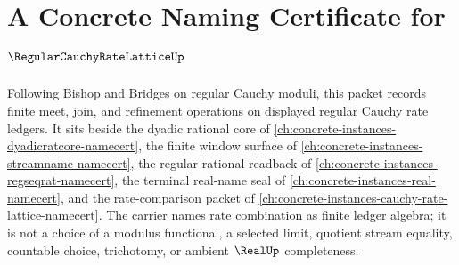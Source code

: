 \chapter{A Concrete Naming Certificate for $\RegularCauchyRateLatticeUp$}
\label{ch:concrete-instances-regular-cauchy-rate-lattice-namecert}

Following Bishop and Bridges on regular Cauchy moduli, this packet records finite meet, join, and refinement operations on displayed regular Cauchy rate ledgers. It sits beside the dyadic rational core of \autoref{ch:concrete-instances-dyadicratcore-namecert}, the finite window surface of \autoref{ch:concrete-instances-streamname-namecert}, the regular rational readback of \autoref{ch:concrete-instances-regseqrat-namecert}, the terminal real-name seal of \autoref{ch:concrete-instances-real-namecert}, and the rate-comparison packet of \autoref{ch:concrete-instances-cauchy-rate-lattice-namecert}. The carrier names rate combination as finite ledger algebra; it is not a choice of a modulus functional, a selected limit, quotient stream equality, countable choice, trichotomy, or ambient $\RealUp$ completeness.

